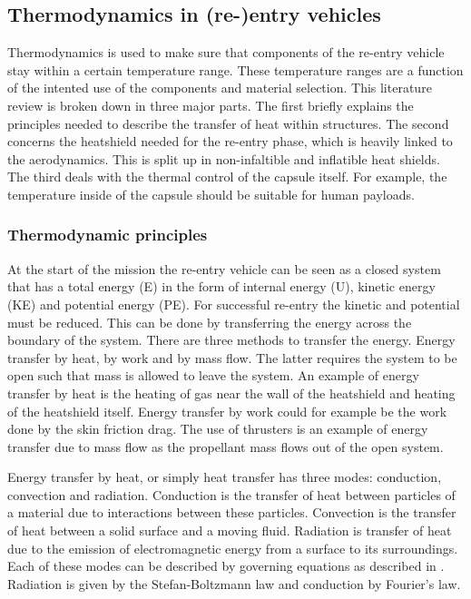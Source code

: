\subsection{Thermodynamics in (re-)entry vehicles}\label{sec:thermo}
Thermodynamics is used to make sure that components of the re-entry vehicle stay within a certain temperature range. These temperature ranges are a function of the intented use of the components and material selection. This literature review is broken down in three major parts. The first briefly explains the principles needed to describe the transfer of heat within structures. The second concerns the heatshield needed for the re-entry phase, which is heavily linked to the aerodynamics. This is split up in non-infaltible and inflatible heat shields. The third deals with the thermal control of the capsule itself. For example, the temperature inside of the capsule should be suitable for human payloads.

\subsubsection{Thermodynamic principles}
At the start of the mission the re-entry vehicle can be seen as a closed system that has a total energy (E) in the form of internal energy (U), kinetic energy (KE) and potential energy (PE). For successful re-entry the kinetic and potential must be reduced. This can be done by transferring the energy across the boundary of the system. There are three methods to transfer the energy. Energy transfer by heat, by work and by mass flow. The latter requires the system to be open such that mass is allowed to leave the system. \cite{Cengel2010} An example of energy transfer by heat is the heating of gas near the wall of the heatshield and heating of the heatshield itself. Energy transfer by work could for example be the work done by the skin friction drag. The use of thrusters is an example of energy transfer due to mass flow as the propellant mass flows out of the open system. 

Energy transfer by heat, or simply heat transfer has three modes: conduction, convection and radiation. Conduction is the transfer of heat between particles of a material due to interactions between these particles. Convection is the transfer of heat between a solid surface and a moving fluid. Radiation is transfer of heat due to the emission of electromagnetic energy from a surface to its surroundings. \cite{Cengel2010, Karam1998} Each of these modes can be described by governing equations as described in \cite{Holman2002}. Radiation is given by the Stefan-Boltzmann law and conduction by Fourier's law. \cite{Cengel2010, Holman2002}


